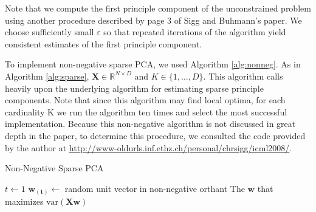 \documentclass{article}
\begin{document}
Note that we compute the first principle component of the
unconstrained problem using another procedure described by
page 3 of Sigg and Buhmann's paper.
We choose sufficiently small $\varepsilon$ so that repeated
iterations of the algorithm yield consistent estimates of
the first principle component.

To implement non-negative sparse PCA, we used Algorithm \ref{alg:nonneg}.
As in Algorithm \ref{alg:sparse},
$\mathbf{X} \in \mathds{R}^{ N\times D}$ and $K \in \{1, \ldots, D\}$.
This algorithm calls heavily upon the underlying algorithm for
estimating sparse principle components.
Note that since this algorithm may find local optima,
for each cardinality K we run the algorithm ten times
and select the most successful implementation.
Because this non-negative algorithm is not discussed in great depth
in the paper, to determine this procedure, we consulted the code
provided by the author at
\url{http://www-oldurls.inf.ethz.ch/personal/chrsigg/icml2008/}.

\begin{algorithm}[h]\dontprintsemicolon
  \caption{Non-Negative Sparse PCA}
  \label{alg:nonneg}
   {
    $t \leftarrow 1$ \;
    $\mathbf{w_{(t)}} \leftarrow$
      random unit vector in non-negative orthant \;
  }
  \Return The $\mathbf{w}$ that maximizes $\textrm{var}(\mathbf{Xw})$
\end{algorithm}
\end{document}
